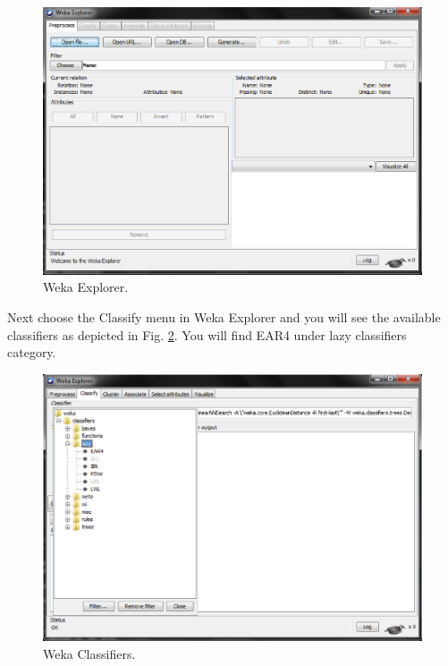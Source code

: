 \documentclass[a4paper]{article}
\begin{document}
\begin{figure}[htb]
  \begin{center}
  \includegraphics[scale=0.5]{figures/wekaExplorer.eps}
  \caption{Weka Explorer.}
  \label{fig:wekaExplorer}
  \end{center}
\end{figure}

Next choose the Classify menu in Weka Explorer and you will see the available classifiers as depicted 
in Fig. \ref{fig:wekaClassifiers}. You will find EAR4 under lazy classifiers category. 

\begin{figure}[htb]
  \begin{center}
  \includegraphics[scale=0.4]{figures/wekaClassifiers.eps}
  \caption{Weka Classifiers.}
  \label{fig:wekaClassifiers}
  \end{center}
\end{figure}
\end{document}
